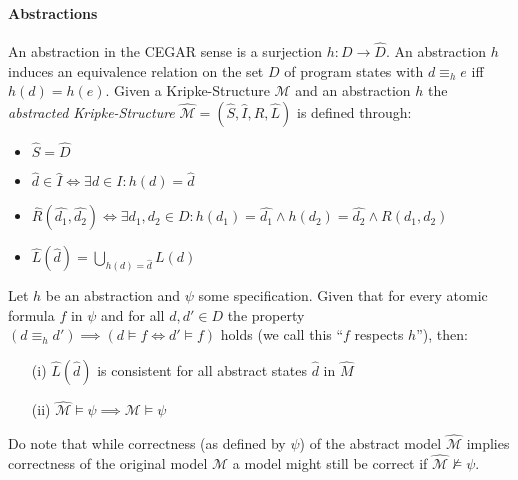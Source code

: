 \paragraph{Abstractions}
An abstraction in the CEGAR sense is a surjection $h\colon D \to \hat{D}$. An abstraction $h$ induces an equivalence relation on the set $D$ of program states with $d \equiv_h e$ iff $h\left(d\right) = h\left(e\right)$.   Given a Kripke-Structure $\mathcal{M}$ and an abstraction $h$ the \textit{abstracted Kripke-Structure} $\hat{\mathcal{M}} = \left(\hat{S},\hat{I},\hat{R},\hat{L}\right)$ is defined through:
\begin{itemize}
    \item $\hat{S} = \hat{D}$
    \item $\hat{d} \in \hat{I} \iff \exists d \in I\colon h\left(d\right) = \hat{d}$
    \item $\hat{R}\left(\hat{d_1},\hat{d_2}\right) \iff \exists d_1,d_2 \in D\colon h\left(d_1\right) = \hat{d_1} \land h\left(d_2\right) = \hat{d_2} \land R\left(d_1, d_2\right)$
    \item $\hat{L}\left(\hat{d}\right)=\bigcup\limits_{h\left(d\right)=\hat{d}} L\left(d\right)$
\end{itemize}

\begin{theorem}
    \label{theorem:related_work:cegar:sat}
    Let $h$ be an abstraction and $\psi$ some specification.
    Given that for every atomic formula $f$ in $\psi$ and for all $d,d' \in D$ the property $\left(d \equiv_h d'\right) \implies \left( d \vDash f \Leftrightarrow d' \vDash f \right)$ holds (we call this \enquote{$f$ respects $h$}), then:\\
    \begin{itemize}
        \item[(i)] $\hat{L}\left(\hat{d}\right)$ is consistent for all abstract states $\hat{d}$ in $\hat{M}$
        \item[(ii)] $\hat{\mathcal{M}}\vDash\psi \implies \mathcal{M} \vDash \psi$
    \end{itemize}
\end{theorem}
Do note that while correctness (as defined by $\psi$) of the abstract model $\hat{\mathcal{M}}$ implies correctness of the original model $\mathcal{M}$ a model might still be correct if $\hat{\mathcal{M}} \nvDash \psi$.

